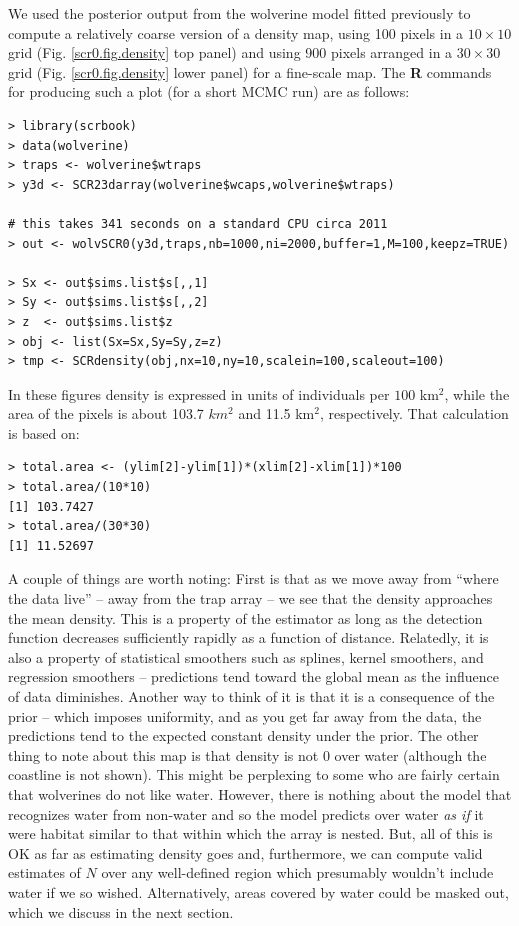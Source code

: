 We used the posterior output from the wolverine model fitted
previously to compute a relatively coarse version of a density map,
using 100 pixels in a $10 \times 10$ grid (Fig. \ref{scr0.fig.density}
top panel) and using 900 pixels arranged in a $30 \times 30$ grid
(Fig. \ref{scr0.fig.density} lower panel) for a fine-scale map. The
{\bf R} commands for producing such a plot (for a short MCMC run) are as
follows:
{\small
\begin{verbatim}
> library(scrbook)
> data(wolverine)
> traps <- wolverine$wtraps
> y3d <- SCR23darray(wolverine$wcaps,wolverine$wtraps)

# this takes 341 seconds on a standard CPU circa 2011
> out <- wolvSCR0(y3d,traps,nb=1000,ni=2000,buffer=1,M=100,keepz=TRUE)

> Sx <- out$sims.list$s[,,1]
> Sy <- out$sims.list$s[,,2]
> z  <- out$sims.list$z
> obj <- list(Sx=Sx,Sy=Sy,z=z)
> tmp <- SCRdensity(obj,nx=10,ny=10,scalein=100,scaleout=100)
\end{verbatim}
In these figures density is
expressed in units of individuals per $100$ km$^2$, while the area of
the pixels is about 103.7 $km^2$ and 11.5 km$^2$, respectively. That
calculation is based on:
\begin{verbatim}
> total.area <- (ylim[2]-ylim[1])*(xlim[2]-xlim[1])*100
> total.area/(10*10)
[1] 103.7427
> total.area/(30*30)
[1] 11.52697
\end{verbatim}

A couple of things are worth noting: First is that as we move away
from ``where the data live'' -- away from the trap array -- we see
that the density approaches the mean density. This is a property of
the estimator as long as the detection function decreases sufficiently
rapidly as a function of distance.  Relatedly, it is also a property
of statistical smoothers such as splines, kernel smoothers, and
regression smoothers -- predictions tend toward the global mean as the
influence of data diminishes.  Another way to think of it is that it
is a consequence of the prior -- which imposes uniformity, and as you
get far away from the data, the predictions tend to the expected
constant density under the prior.  The other thing to note about this
map is that density is not $0$ over water (although the coastline is
not shown). This might be perplexing to some who are fairly certain
that wolverines do not like water. However, there is nothing about the
model that recognizes water from non-water and so the model predicts
over water {\it as if} it were habitat similar to that within which
the array is nested. But, all of this is OK as far as estimating
density goes and, furthermore, we can compute valid estimates of $N$
over any well-defined region which presumably wouldn't include water
if we so wished. Alternatively, areas covered by water could be masked
out, which we discuss in the next section.

}
